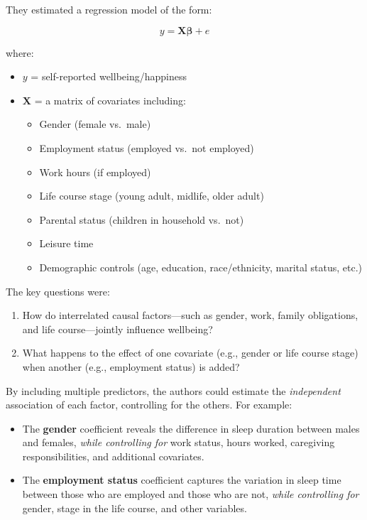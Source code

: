 \documentclass[
  letterpaper,
  DIV=11,
  numbers=noendperiod]{scrreprt}
\providecommand{\tightlist}{%
  \setlength{\itemsep}{0pt}\setlength{\parskip}{0pt}}
\begin{document}
They estimated a regression model of the form:

\[
y = \mathbf{X} \boldsymbol{\beta} + e
\]

where:

\begin{itemize}
\tightlist
\item
  \(y\) = self-reported wellbeing/happiness
\item
  \(\mathbf{X}\) = a matrix of covariates including:

  \begin{itemize}
  \tightlist
  \item
    Gender (female vs.~male)
  \item
    Employment status (employed vs.~not employed)
  \item
    Work hours (if employed)
  \item
    Life course stage (young adult, midlife, older adult)
  \item
    Parental status (children in household vs.~not)
  \item
    Leisure time
  \item
    Demographic controls (age, education, race/ethnicity, marital
    status, etc.)
  \end{itemize}
\end{itemize}

The key questions were:

\begin{enumerate}
\def\labelenumi{\arabic{enumi}.}
\item
  How do interrelated causal factors---such as gender, work, family
  obligations, and life course---jointly influence wellbeing?
\item
  What happens to the effect of one covariate (e.g., gender or life
  course stage) when another (e.g., employment status) is added?
\end{enumerate}

By including multiple predictors, the authors could estimate the
\emph{independent} association of each factor, controlling for the
others. For example:

\begin{itemize}
\item
  The \textbf{gender} coefficient reveals the difference in sleep
  duration between males and females, \emph{while controlling for} work
  status, hours worked, caregiving responsibilities, and additional
  covariates.
\item
  The \textbf{employment status} coefficient captures the variation in
  sleep time between those who are employed and those who are not,
  \emph{while controlling for} gender, stage in the life course, and
  other variables.
\end{itemize}
\end{document}
